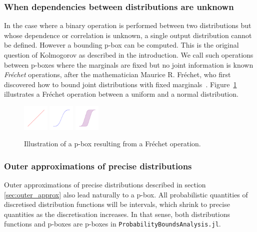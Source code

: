 \documentclass{juliacon}
\begin{document}
\subsubsection{When dependencies between distributions are unknown}
In the case where a binary operation is performed between two distributions but whose dependence or correlation is unknown, a single output distribution cannot be defined. However a bounding p-box can be computed. This is the original question of Kolmogorov as described in the introduction. We call such operations between p-boxes where the marginals are fixed but no joint information is known \textit{Fréchet} operations, after the mathematician Maurice R. Fréchet, who first discovered how to bound joint distributions with fixed marginals~\cite{frechet1935generalisation}. Figure~\ref{fig:figure5} illustrates a Fréchet operation between a uniform and a normal distribution.
\begin{figure}[h!]
  \centering
  \includegraphics[width=0.11\textwidth]{../examples/JuliaCon/fig5/fig5_dist1.pdf}
  \includegraphics[width=0.11\textwidth]{../examples/JuliaCon/fig5/fig5_dist2.pdf}
  \raisebox{9.0mm}{{\Large$\rightarrow$}}
  \includegraphics[width=0.11\textwidth]{../examples/JuliaCon/fig5/fig5_pbox.pdf}
  \caption{Illustration of a p-box resulting from a Fréchet operation.}
  \label{fig:figure5}
\end{figure}
\subsubsection{Outer approximations of precise distributions}
Outer approximations of precise distributions described in section \ref{sec:outer_approx} also lead naturally to a p-box. All probabilistic quantities of discretised distribution functions will be intervals, which shrink to precise quantities as the discretisation increases. In that sense, both distributions functions and p-boxes are p-boxes in \texttt{ProbabilityBoundsAnalysis.jl}.
\end{document}
